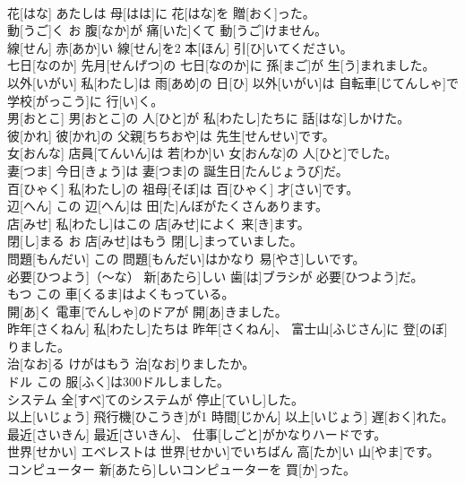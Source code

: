 \documentclass[8pt]{extreport}
\begin{document}
\begin{CJK}{UTF8}{min}
\\	花[はな]	あたしは 母[はは]に 花[はな]を 贈[おく]った。		
\\	動[うご]く	お 腹[なか]が 痛[いた]くて 動[うご]けません。		
\\	線[せん]	赤[あか]い 線[せん]を2 本[ほん] 引[ひ]いてください。		
\\	七日[なのか]	先月[せんげつ]の 七日[なのか]に 孫[まご]が 生[う]まれました。		
\\	以外[いがい]	私[わたし]は 雨[あめ]の 日[ひ] 以外[いがい]は 自転車[じてんしゃ]で 学校[がっこう]に 行[い]く。		
\\	男[おとこ]	男[おとこ]の 人[ひと]が 私[わたし]たちに 話[はな]しかけた。		
\\	彼[かれ]	彼[かれ]の 父親[ちちおや]は 先生[せんせい]です。		
\\	女[おんな]	店員[てんいん]は 若[わか]い 女[おんな]の 人[ひと]でした。		
\\	妻[つま]	今日[きょう]は 妻[つま]の 誕生日[たんじょうび]だ。		
\\	百[ひゃく]	私[わたし]の 祖母[そぼ]は 百[ひゃく] 才[さい]です。		
\\	辺[へん]	この 辺[へん]は 田[た]んぼがたくさんあります。		
\\	店[みせ]	私[わたし]はこの 店[みせ]によく 来[き]ます。		
\\	閉[し]まる	お 店[みせ]はもう 閉[し]まっていました。		
\\	問題[もんだい]	この 問題[もんだい]はかなり 易[やさ]しいです。		
\\	必要[ひつよう]（～な）	新[あたら]しい 歯[は]ブラシが 必要[ひつよう]だ。		
\\	もつ	この 車[くるま]はよくもっている。		
\\	開[あ]く	電車[でんしゃ]のドアが 開[あ]きました。		
\\	昨年[さくねん]	私[わたし]たちは 昨年[さくねん]、 富士山[ふじさん]に 登[のぼ]りました。		
\\	治[なお]る	けがはもう 治[なお]りましたか。		
\\	ドル	この 服[ふく]は300ドルしました。		
\\	システム	全[すべ]てのシステムが 停止[ていし]した。		
\\	以上[いじょう]	飛行機[ひこうき]が1 時間[じかん] 以上[いじょう] 遅[おく]れた。		
\\	最近[さいきん]	最近[さいきん]、 仕事[しごと]がかなりハードです。		
\\	世界[せかい]	エベレストは 世界[せかい]でいちばん 高[たか]い 山[やま]です。		
\\	コンピューター	新[あたら]しいコンピューターを 買[か]った。		

\end{CJK}
\end{document}

